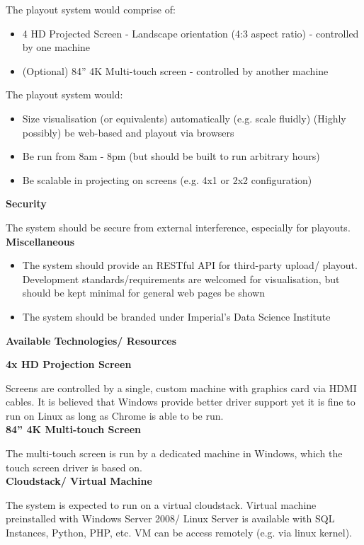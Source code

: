 \documentclass[a4paper, titlepage]{article}
\begin{document}
The playout system would comprise of:

\begin{itemize}
\item 4 HD Projected Screen - Landscape orientation (4:3 aspect ratio) - controlled by one machine 
\item (Optional) 84” 4K Multi-touch screen - controlled by another machine
\end{itemize}

The playout system would:

\begin{itemize}
\item Size visualisation (or equivalents) automatically (e.g. scale fluidly) (Highly possibly) be web-based and playout via browsers
\item Be run from 8am - 8pm (but should be built to run arbitrary hours)
\item Be scalable in projecting on screens (e.g. 4x1 or 2x2 configuration)\\
\end{itemize}

\textbf{\large Security}

The system should be secure from external interference, especially for playouts.\\

\textbf{\large Miscellaneous}

\begin{itemize}
\item The system should provide an RESTful API for third-party upload/ playout.
Development standards/requirements are welcomed for visualisation, but should be kept minimal for general web pages be shown
\item The system should be branded under Imperial’s Data Science Institute\\
\end{itemize}


\textbf{\Large Available Technologies/ Resources} \vspace{5pt}

\textbf{\large 4x HD Projection Screen}

Screens are controlled by a single, custom machine with graphics card via HDMI cables. It is believed that Windows provide better driver support yet it is fine to run on Linux as long as Chrome is able to be run.\\

\textbf{\large 84” 4K Multi-touch Screen}

The multi-touch screen is run by a dedicated machine in Windows, which the touch screen driver is based on.\\

\textbf{\large Cloudstack/ Virtual Machine}

The system is expected to run on a virtual cloudstack. Virtual machine preinstalled with Windows Server 2008/ Linux Server is available with SQL Instances, Python, PHP, etc. VM can be access remotely (e.g. via linux kernel).\\
\end{document}
